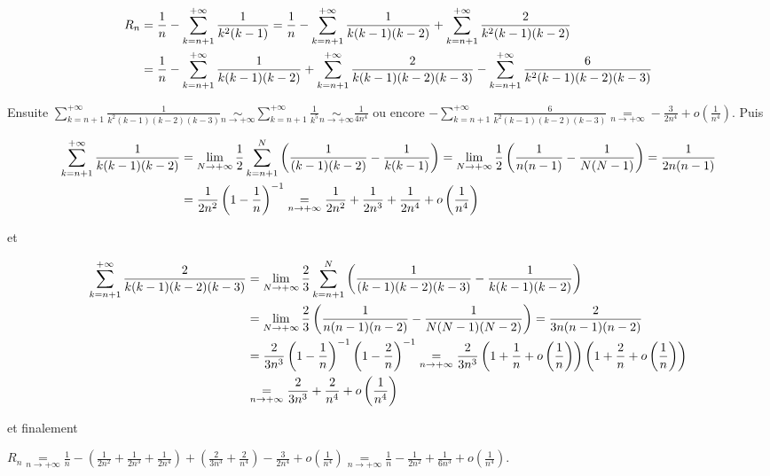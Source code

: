 {{\begin{align*}\ensuremath
R_n&=\frac{1}{n}-\sum_{k=n+1}^{+\infty}\frac{1}{k^2(k-1)}=\frac{1}{n}-\sum_{k=n+1}^{+\infty}\frac{1}{k(k-1)(k-2)}+\sum_{k=n+1}^{+\infty}\frac{2}{k^2(k-1)(k-2)}\\
 &=\frac{1}{n}-\sum_{k=n+1}^{+\infty}\frac{1}{k(k-1)(k-2)}+\sum_{k=n+1}^{+\infty}\frac{2}{k(k-1)(k-2)(k-3)}-\sum_{k=n+1}^{+\infty}\frac{6}{k^2(k-1)(k-2)(k-3)}
\end{align*}

Ensuite  $\sum_{k=n+1}^{+\infty}\frac{1}{k^2(k-1)(k-2)(k-3)}\underset{n\rightarrow+\infty}{\sim}\sum_{k=n+1}^{+\infty}\frac{1}{k^5}\underset{n\rightarrow+\infty}{\sim}\frac{1}{4n^4}$ ou encore $-\sum_{k=n+1}^{+\infty}\frac{6}{k^2(k-1)(k-2)(k-3)}\underset{n\rightarrow+\infty}{=}-\frac{3}{2n^4}+o\left(\frac{1}{n^4}\right)$. Puis

\begin{align*}\ensuremath
\sum_{k=n+1}^{+\infty}\frac{1}{k(k-1)(k-2)}&=\lim_{N \rightarrow +\infty}\frac{1}{2}\sum_{k=n+1}^{N}\left(\frac{1}{(k-1)(k-2)}-\frac{1}{k(k-1)}\right)=\lim_{N \rightarrow +\infty}\frac{1}{2}\left(\frac{1}{n(n-1)}-\frac{1}{N(N-1)}\right)=\frac{1}{2n(n-1)}\\
 &=\frac{1}{2n^2}\left(1-\frac{1}{n}\right)^{-1}\underset{n\rightarrow+\infty}{=}\frac{1}{2n^2}+\frac{1}{2n^3}+\frac{1}{2n^4}+o\left(\frac{1}{n^4}\right)
\end{align*}

et

\begin{align*}\ensuremath
\sum_{k=n+1}^{+\infty}\frac{2}{k(k-1)(k-2)(k-3)}&=\lim_{N \rightarrow +\infty}\frac{2}{3}\sum_{k=n+1}^{N}\left(\frac{1}{(k-1)(k-2)(k-3)}-\frac{1}{k(k-1)(k-2)}\right)\\
 &=\lim_{N \rightarrow +\infty}\frac{2}{3}\left(\frac{1}{n(n-1)(n-2)}-\frac{1}{N(N-1)(N-2)}\right)=\frac{2}{3n(n-1)(n-2)}\\
 &=\frac{2}{3n^3}\left(1-\frac{1}{n}\right)^{-1}\left(1-\frac{2}{n}\right)^{-1}\underset{n\rightarrow+\infty}{=}\frac{2}{3n^3}\left(1+\frac{1}{n}+o\left(\frac{1}{n}\right)\right)\left(1+\frac{2}{n}+o\left(\frac{1}{n}\right)\right)\\
  &\underset{n\rightarrow+\infty}{=}\frac{2}{3n^3}+\frac{2}{n^4}+o\left(\frac{1}{n^4}\right)
\end{align*}

et finalement

\begin{center}
$R_n\underset{n\rightarrow+\infty}{=}\frac{1}{n}-\left(\frac{1}{2n^2}+\frac{1}{2n^3}+\frac{1}{2n^4}\right)+\left(\frac{2}{3n^3}+\frac{2}{n^4}\right)-\frac{3}{2n^4}+o\left(\frac{1}{n^4}\right)\underset{n\rightarrow+\infty}{=}\frac{1}{n}-\frac{1}{2n^2}+\frac{1}{6n^3}+o\left(\frac{1}{n^4}\right)$.
\end{center}

\begin{center}
\end{center}
}
}

